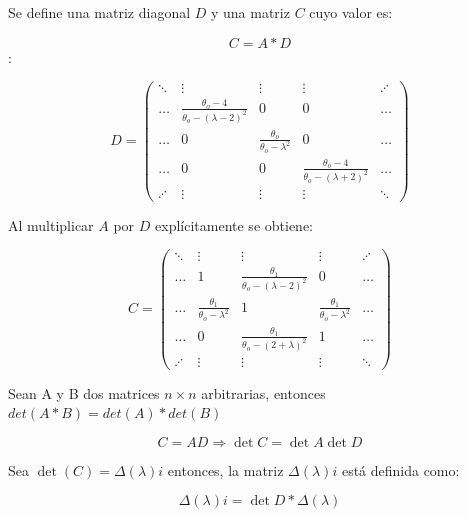 Se define una matriz diagonal $D$ y una matriz $C$ cuyo valor es:

\begin{equation}\label{eq:E.12}
    C=A*D
\end{equation}:

\large
\begin{equation}\label{eq:E.11}
D= \begin{pmatrix}
\ddots & \vdots & \vdots & \vdots & \iddots \\
\dots & \frac{\theta_o-4}{\theta_o-(\lambda-2)^2} &0 & 0 & \dots \\[0.3cm] 
\dots & 0 & \frac{\theta_o}{\theta_o-\lambda^2} & 0 & \dots \\[0.3cm]
 \dots & 0 & 0 & \frac{\theta_o-4}{\theta_o-(\lambda+2)^2} & \dots \\[0.3cm]
 \iddots & \vdots & \vdots & \vdots& \ddots
\end{pmatrix}
\end{equation}
\normalsize

Al multiplicar $A$ por $D$ explícitamente se obtiene:

\large
\begin{equation}\label{eq:E.13}
C= 
\begin{pmatrix}
\ddots & \vdots & \vdots & \vdots & \iddots \\
\dots & 1 & \frac{\theta_1}{\theta_o-(\lambda-2)^2} & 0 & \dots \\ 
\dots  & \frac{\theta_1}{\theta_o-\lambda^2} & 1 & \frac{\theta_1}{\theta_o-\lambda^2} &\dots\\
 \dots  & 0 & \frac{\theta_1}{\theta_o- (2+\lambda)^2} & 1 & \dots\\ 
 \iddots & \vdots & \vdots & \vdots & \ddots
\end{pmatrix}
\end{equation}
\normalsize 

\begin{teo}
 Sean A y B dos matrices $n\times n$ arbitrarias, entonces $det(A*B)=det(A)*det(B)$\cite{jacob}
\end{teo}


\begin{equation}\label{eq:E.14}
C=AD \Rightarrow \det C= \det A \det D
\end{equation}

Sea $\det(C)=\Delta(\lambda){i}$ entonces, la matriz $\Delta(\lambda){i}$ está definida como:

\begin{equation}\label{eq:E.15}
\Delta(\lambda){i}=\det D *\Delta(\lambda)
\end{equation}

